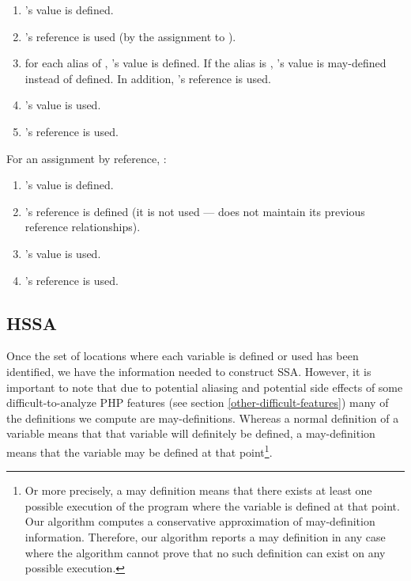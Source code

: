 \begin{enumerate}
	\item
		's value is defined.
	\item
		's reference is used (by the assignment to ).
	\item
		for each alias  of , 's
                value is defined.  If the alias is ,
                's value is may-defined instead of defined.
                In addition, 's reference is used.
	\item
		's value is used.
	\item
		's reference is used.

\end{enumerate}

For an assignment by reference, :

\begin{enumerate}
	\item
		's value is defined.
	\item
		's reference is defined (it is not
                used ---  does not maintain its previous
                reference relationships).

	\item
		's value is used.

	\item
		's reference is used.

\end{enumerate}



\subsection{HSSA}

Once the set of locations where each variable is defined or used has
been identified, we have the information needed to construct SSA.
However, it is important to note that due to potential aliasing and
potential side effects of some difficult-to-analyze PHP features (see
section \ref{other-difficult-features}) many of the definitions we
compute are may-definitions. Whereas a normal definition of a variable
means that that variable will definitely be defined, a may-definition
means that the variable may be defined at that point\footnote{Or more
  precisely, a may definition means that there exists at least one
  possible execution of the program where the variable is defined at
  that point. Our algorithm computes a conservative approximation of
  may-definition information. Therefore, our algorithm reports a may
  definition in any case where the algorithm cannot prove that no such
  definition can exist on any possible execution.}.

